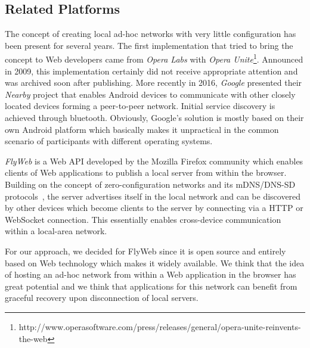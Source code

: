 \subsection{Related Platforms}
\label{sec:related_platforms}

The concept of creating local ad-hoc networks with very little configuration has been present for several years. The first implementation that tried to bring the concept to Web developers came from \textit{Opera Labs} with \textit{Opera Unite}\footnote{http://www.operasoftware.com/press/releases/general/opera-unite-reinvents-the-web}. Announced in 2009, this implementation certainly did not receive appropriate attention and was archived soon after publishing. More recently in 2016, \textit{Google} presented their \textit{Nearby} project that enables Android devices to communicate with other closely located devices forming a peer-to-peer network. Initial service discovery is achieved through bluetooth. Obviously, Google's solution is mostly based on their own Android platform which basically makes it unpractical in the common scenario of participants with different operating systems.

\textit{FlyWeb} is a Web API developed by the Mozilla Firefox community which enables clients of Web applications to publish a local server from within the browser. Building on the concept of zero-configuration networks and its mDNS/DNS-SD protocols~\cite{rfc6762, rfc6763}, the server advertises itself in the local network and can be discovered by other devices which become clients to the server by connecting via a HTTP or WebSocket connection. This essentially enables cross-device communication within a local-area network.

For our approach, we decided for FlyWeb since it is open source and entirely based on Web technology which makes it widely available. We think that the idea of hosting an ad-hoc network from within a Web application in the browser has great potential and we think that applications for this network can benefit from graceful recovery upon disconnection of local servers.